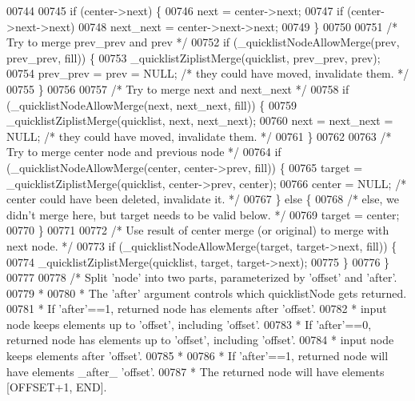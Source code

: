 \begin{DoxyCode}
{{00744 
00745     \textcolor{keywordflow}{if} (center->next) \{
00746         next = center->next;
00747         \textcolor{keywordflow}{if} (center->next->next)
00748             next\_next = center->next->next;
00749     \}
00750 
00751     \textcolor{comment}{/* Try to merge prev\_prev and prev */}
00752     \textcolor{keywordflow}{if} (\_quicklistNodeAllowMerge(prev, prev\_prev, fill)) \{
00753         \_quicklistZiplistMerge(quicklist, prev\_prev, prev);
00754         prev\_prev = prev = NULL; \textcolor{comment}{/* they could have moved, invalidate them. */}
00755     \}
00756 
00757     \textcolor{comment}{/* Try to merge next and next\_next */}
00758     \textcolor{keywordflow}{if} (\_quicklistNodeAllowMerge(next, next\_next, fill)) \{
00759         \_quicklistZiplistMerge(quicklist, next, next\_next);
00760         next = next\_next = NULL; \textcolor{comment}{/* they could have moved, invalidate them. */}
00761     \}
00762 
00763     \textcolor{comment}{/* Try to merge center node and previous node */}
00764     \textcolor{keywordflow}{if} (\_quicklistNodeAllowMerge(center, center->prev, fill)) \{
00765         target = \_quicklistZiplistMerge(quicklist, center->prev, center);
00766         center = NULL; \textcolor{comment}{/* center could have been deleted, invalidate it. */}
00767     \} \textcolor{keywordflow}{else} \{
00768         \textcolor{comment}{/* else, we didn't merge here, but target needs to be valid below. */}
00769         target = center;
00770     \}
00771 
00772     \textcolor{comment}{/* Use result of center merge (or original) to merge with next node. */}
00773     \textcolor{keywordflow}{if} (\_quicklistNodeAllowMerge(target, target->next, fill)) \{
00774         \_quicklistZiplistMerge(quicklist, target, target->next);
00775     \}
00776 \}
00777 
00778 \textcolor{comment}{/* Split 'node' into two parts, parameterized by 'offset' and 'after'.}
00779 \textcolor{comment}{ *}
00780 \textcolor{comment}{ * The 'after' argument controls which quicklistNode gets returned.}
00781 \textcolor{comment}{ * If 'after'==1, returned node has elements after 'offset'.}
00782 \textcolor{comment}{ *                input node keeps elements up to 'offset', including 'offset'.}
00783 \textcolor{comment}{ * If 'after'==0, returned node has elements up to 'offset', including 'offset'.}
00784 \textcolor{comment}{ *                input node keeps elements after 'offset'.}
00785 \textcolor{comment}{ *}
00786 \textcolor{comment}{ * If 'after'==1, returned node will have elements \_after\_ 'offset'.}
00787 \textcolor{comment}{ *                The returned node will have elements [OFFSET+1, END].}
}}
\end{DoxyCode}
